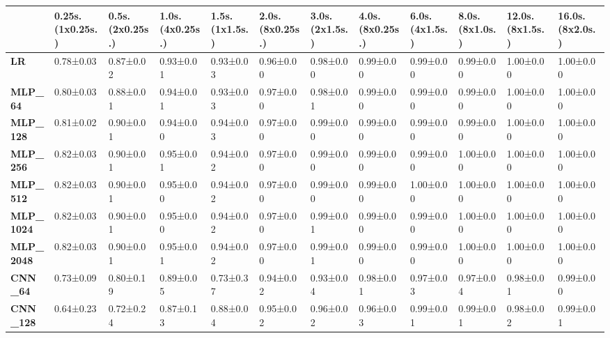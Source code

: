 \begin{tabular}{llllllllllll}
\toprule
{} & 0.25s. (1x0.25s.) & 0.5s. (2x0.25s.) & 1.0s. (4x0.25s.) & 1.5s. (1x1.5s.) & 2.0s. (8x0.25s.) & 3.0s. (2x1.5s.) & 4.0s. (8x0.25s.) & 6.0s. (4x1.5s.) & 8.0s. (8x1.0s.) & 12.0s. (8x1.5s.) & 16.0s. (8x2.0s.) \\
\midrule
\textbf{LR            } &         0.78±0.03 &        0.87±0.02 &        0.93±0.01 &       0.93±0.03 &        0.96±0.00 &       0.98±0.00 &        0.99±0.00 &       0.99±0.00 &       0.99±0.00 &        1.00±0.00 &        1.00±0.00 \\
\textbf{MLP\_64        } &         0.80±0.03 &        0.88±0.01 &        0.94±0.01 &       0.93±0.03 &        0.97±0.00 &       0.98±0.01 &        0.99±0.00 &       0.99±0.00 &       0.99±0.00 &        1.00±0.00 &        1.00±0.00 \\
\textbf{MLP\_128       } &         0.81±0.02 &        0.90±0.01 &        0.94±0.00 &       0.94±0.03 &        0.97±0.00 &       0.99±0.00 &        0.99±0.00 &       0.99±0.00 &       0.99±0.00 &        1.00±0.00 &        1.00±0.00 \\
\textbf{MLP\_256       } &         0.82±0.03 &        0.90±0.01 &        0.95±0.01 &       0.94±0.02 &        0.97±0.00 &       0.99±0.00 &        0.99±0.00 &       0.99±0.00 &       1.00±0.00 &        1.00±0.00 &        1.00±0.00 \\
\textbf{MLP\_512       } &         0.82±0.03 &        0.90±0.01 &        0.95±0.00 &       0.94±0.02 &        0.97±0.00 &       0.99±0.00 &        0.99±0.00 &       1.00±0.00 &       1.00±0.00 &        1.00±0.00 &        1.00±0.00 \\
\textbf{MLP\_1024      } &         0.82±0.03 &        0.90±0.01 &        0.95±0.00 &       0.94±0.02 &        0.97±0.00 &       0.99±0.01 &        0.99±0.00 &       0.99±0.00 &       1.00±0.00 &        1.00±0.00 &        1.00±0.00 \\
\textbf{MLP\_2048      } &         0.82±0.03 &        0.90±0.01 &        0.95±0.01 &       0.94±0.02 &        0.97±0.00 &       0.99±0.01 &        0.99±0.00 &       0.99±0.00 &       1.00±0.00 &        1.00±0.00 &        1.00±0.00 \\
\textbf{CNN\_64        } &         0.73±0.09 &        0.80±0.19 &        0.89±0.05 &       0.73±0.37 &        0.94±0.02 &       0.93±0.04 &        0.98±0.01 &       0.97±0.03 &       0.97±0.04 &        0.98±0.01 &        0.99±0.00 \\
\textbf{CNN\_128       } &         0.64±0.23 &        0.72±0.24 &        0.87±0.13 &       0.88±0.04 &        0.95±0.02 &       0.96±0.02 &        0.96±0.03 &       0.99±0.01 &       0.99±0.01 &        0.98±0.02 &        0.99±0.01 \\

\end{tabular}
